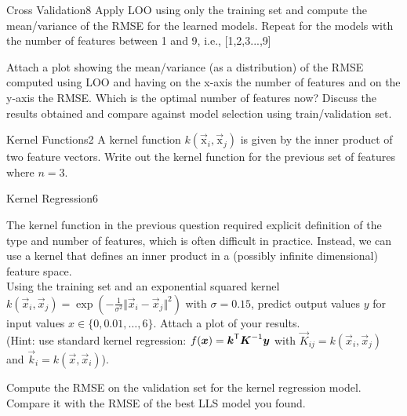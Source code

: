 \begin{questions}
\begin{question}{Cross Validation}{8}
		Apply LOO using only the training set and compute the mean/variance of the RMSE for the learned models. 
		Repeat for the models with the number of features between 1 and 9, i.e.,  [1,2,3...,9]
		
		Attach a plot showing the mean/variance (as a distribution) of the RMSE computed using LOO and having on the x-axis the number of features and on the y-axis the RMSE.
		Which is the optimal number of features now? 
		Discuss the results obtained and compare against model selection using train/validation set.
		
\begin{answer}\end{answer}
	\end{question}
	
	
	
	
	
	\begin{question}{Kernel Functions}{2}
		A kernel function $k(\vec{\mbox{x}}_{i},\vec{\mbox{x}}_{j})$ is given by the inner product of two feature vectors. Write out the kernel function for the previous set of features where $n=3$.
		
\begin{answer}\end{answer}
	\end{question}
	
	
	
	\begin{question}{Kernel Regression}{6}
		
		The kernel function in the previous question required explicit definition of the type and number of features, which is often difficult in practice. Instead, we can use a kernel that defines an inner product in a (possibly infinite dimensional) feature space. \\
		Using the training set and an exponential squared kernel 		$k( \vec{x}_{i} , \vec{x}_{j} )= \exp ( -\frac{1}{\sigma^{2}} \Vert \vec{x}_{i}-\vec{x}_{j}\Vert ^{2} )$ with $\sigma=0.15$, predict output values $y$ for input values $x\in\{0,0.01,\ldots,6\}$. Attach a plot of your results.
		\\
		(Hint: use standard kernel regression: $f(\mbox{\ensuremath{{\boldsymbol{x}}}})={\boldsymbol{k}}^\mathsf{T}{\boldsymbol{K}}^{-1}{\boldsymbol{y}}$ with $\vec{K}_{ij}=k(\vec{x}_{i},\vec{x}_{j})$ and $\vec{k}_{i}=k(\vec{x},\vec{x}_{i})$).
		
		Compute the RMSE on the validation set for the kernel regression model. Compare it with the RMSE of the best LLS model you found.
		

\end{question}
\end{questions}
